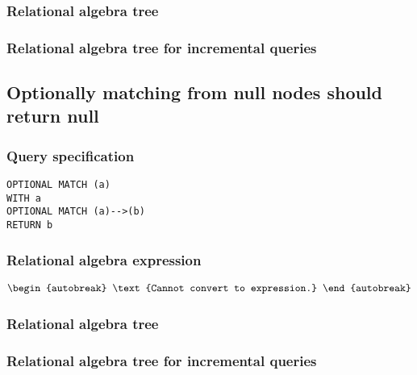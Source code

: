 \subsubsection*{Relational algebra tree}


\subsubsection*{Relational algebra tree for incremental queries}


\subsection{Optionally matching from null nodes should return null}

\subsubsection*{Query specification}

\begin{lstlisting}
OPTIONAL MATCH (a)
WITH a
OPTIONAL MATCH (a)-->(b)
RETURN b
\end{lstlisting}

\subsubsection*{Relational algebra expression}

\begin{align*}
\begin{autobreak}
\text{Cannot convert to expression.}
\end{autobreak}
\end{align*}

\subsubsection*{Relational algebra tree}


\subsubsection*{Relational algebra tree for incremental queries}

